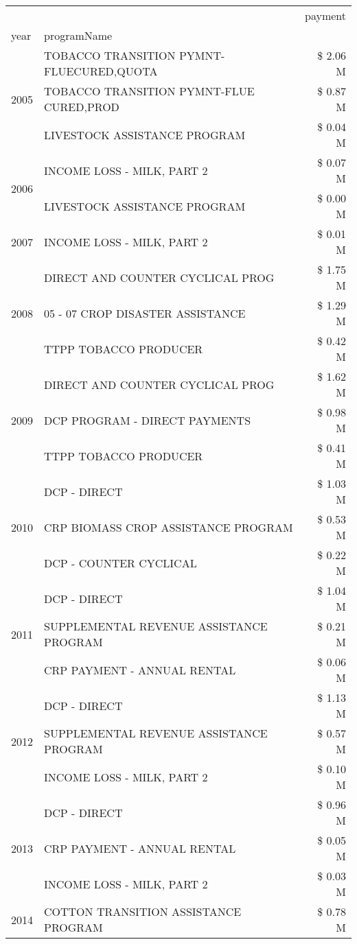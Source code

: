 \begin{tabular}{llr}
\toprule
 &  & payment \\
year & programName &  \\
\midrule
\multirow[t]{3}{*}{2005} & TOBACCO TRANSITION PYMNT-FLUECURED,QUOTA & \$ 2.06 M \\
 & TOBACCO TRANSITION PYMNT-FLUE CURED,PROD & \$ 0.87 M \\
 & LIVESTOCK ASSISTANCE PROGRAM & \$ 0.04 M \\
\cline{1-3}
\multirow[t]{2}{*}{2006} & INCOME LOSS - MILK, PART 2 & \$ 0.07 M \\
 & LIVESTOCK ASSISTANCE PROGRAM & \$ 0.00 M \\
\cline{1-3}
2007 & INCOME LOSS - MILK, PART 2 & \$ 0.01 M \\
\cline{1-3}
\multirow[t]{3}{*}{2008} & DIRECT AND COUNTER CYCLICAL PROG & \$ 1.75 M \\
 & 05 - 07 CROP DISASTER ASSISTANCE & \$ 1.29 M \\
 & TTPP TOBACCO PRODUCER & \$ 0.42 M \\
\cline{1-3}
\multirow[t]{3}{*}{2009} & DIRECT AND COUNTER CYCLICAL PROG & \$ 1.62 M \\
 & DCP PROGRAM - DIRECT PAYMENTS & \$ 0.98 M \\
 & TTPP TOBACCO PRODUCER & \$ 0.41 M \\
\cline{1-3}
\multirow[t]{3}{*}{2010} & DCP - DIRECT & \$ 1.03 M \\
 & CRP BIOMASS CROP ASSISTANCE PROGRAM & \$ 0.53 M \\
 & DCP - COUNTER CYCLICAL & \$ 0.22 M \\
\cline{1-3}
\multirow[t]{3}{*}{2011} & DCP - DIRECT & \$ 1.04 M \\
 & SUPPLEMENTAL REVENUE ASSISTANCE PROGRAM & \$ 0.21 M \\
 & CRP PAYMENT - ANNUAL RENTAL & \$ 0.06 M \\
\cline{1-3}
\multirow[t]{3}{*}{2012} & DCP - DIRECT & \$ 1.13 M \\
 & SUPPLEMENTAL REVENUE ASSISTANCE PROGRAM & \$ 0.57 M \\
 & INCOME LOSS - MILK, PART 2 & \$ 0.10 M \\
\cline{1-3}
\multirow[t]{3}{*}{2013} & DCP - DIRECT & \$ 0.96 M \\
 & CRP PAYMENT - ANNUAL RENTAL & \$ 0.05 M \\
 & INCOME LOSS - MILK, PART 2 & \$ 0.03 M \\
\cline{1-3}
\multirow[t]{3}{*}{2014} & COTTON TRANSITION ASSISTANCE PROGRAM & \$ 0.78 M \\

\end{tabular}
